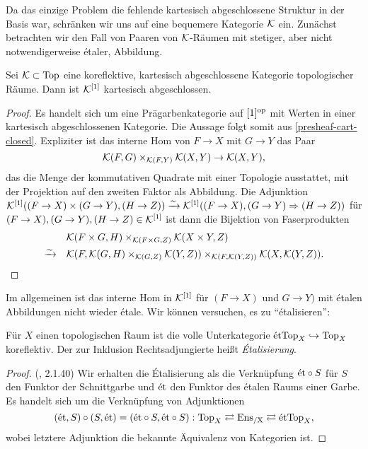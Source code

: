 Da das einzige Problem die fehlende kartesisch abgeschlossene Struktur
in der Basis war, schränken wir uns auf eine bequemere Kategorie $\mathcal{K}$
ein. Zunächst betrachten wir den Fall von Paaren von $\mathcal{K}$-Räumen mit
stetiger, aber nicht notwendigerweise étaler, Abbildung.
\begin{lemma} \label{k-arrow-cart-closed}
  Sei $\mathcal{K} \subset \operatorname{Top}$ eine koreflektive, kartesisch abgeschlossene
  Kategorie topologischer Räume. Dann ist $\mathcal{K}^{[1]}$ kartesisch
  abgeschlossen.
\end{lemma}
\begin{proof}
  Es handelt sich um eine Prägarbenkategorie auf $[1]^\mathrm{op}$ mit Werten in
  einer kartesisch abgeschlossenen Kategorie. Die Aussage folgt somit
  aus \ref{presheaf-cart-closed}. Expliziter ist das interne Hom von
  $F \to X$ mit $G \to Y$ das Paar
  \[ \mathcal{K}(F, G) \times_{\mathcal{K}(F, Y)} \mathcal{K}(X, Y) \to \mathcal{K}(X, Y),
  \]
  das die Menge der kommutativen Quadrate mit einer Topologie
  ausstattet, mit der Projektion auf den zweiten Faktor als
  Abbildung. Die Adjunktion $\mathcal{K}^{[1]}((F \to X) \times (G \to Y), (H
  \to Z)) \xrightarrow[]{\sim} \mathcal{K}^{[1]}((F \to X), (G \to Y) \Rightarrow (H \to Z))$ für
  $(F \to X), (G \to Y), (H \to Z) \in \mathcal{K}^{[1]}$ ist dann die
  Bijektion von Faserprodukten
  \begin{align*}
    &\mathcal{K}(F \times G, H) \times_{\mathcal{K}(F \times G, Z)} \mathcal{K}(X \times Y, Z) \\
    \xrightarrow[]{\sim} \quad &\mathcal{K}(F, \mathcal{K}(G, H) \times_{\mathcal{K}(G, Z)} \mathcal{K}(Y, Z))
    \times_{\mathcal{K}(F, \mathcal{K}(Y, Z))} \mathcal{K}(X, \mathcal{K}(Y, Z)).
  \end{align*}
\end{proof}
Im allgemeinen ist das interne Hom in $\mathcal{K}^{[1]}$ für $(F \to X)$ und $G
\to Y)$ mit étalen Abbildungen nicht wieder étale. Wir können
versuchen, es zu ``étalisieren'':
\begin{lemma}[\cite{TG}, 2.1.40]
  Für $X$ einen topologischen Raum ist die volle Unterkategorie
  $\mathrm{\acute{e}tTop}_X \hookrightarrow \operatorname{Top}_X$ koreflektiv. Der zur Inklusion
  Rechtsadjungierte heißt \emph{Étalisierung}.
\end{lemma}
\begin{proof} (\cite{TG}, 2.1.40)
  Wir erhalten die Étalisierung als die Verknüpfung $\mathrm{\acute{e}t} \circ S$ für
  $S$ den Funktor der Schnittgarbe und $\mathrm{\acute{e}t}$ den Funktor des étalen
  Raums einer Garbe. Es handelt sich um die Verknüpfung von
  Adjunktionen
  \[(\mathrm{\acute{e}t}, S) \circ (S, \mathrm{\acute{e}t}) = (\mathrm{\acute{e}t} \circ S, \mathrm{\acute{e}t} \circ S):
  \operatorname{Top}_X \rightleftarrows \operatorname{Ens_{/X}} \rightleftarrows \mathrm{\acute{e}tTop}_X,
  \]
  wobei letztere Adjunktion die bekannte Äquivalenz von Kategorien
  ist.
\end{proof}

